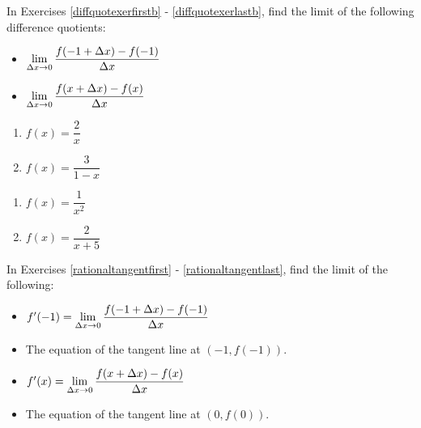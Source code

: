 In Exercises \ref{diffquotexerfirstb} - \ref{diffquotexerlastb}, find the limit of the following difference quotients:

\begin{multicols}{2}

\begin{itemize}

\item  $\displaystyle{\lim_{\Delta x \rightarrow 0} \dfrac{f(-1+\Delta x) - f(-1)}{\Delta x}}$

\item  $\displaystyle{\lim_{\Delta x \rightarrow 0} \dfrac{f(x+\Delta x) - f(x)}{\Delta x}}$

\end{itemize}

\end{multicols}

\begin{multicols}{2}
\begin{enumerate}
\setcounter{enumi}{\value{HW}}

\item $f(x) = \dfrac{2}{x}$  \label{diffquotexerfirstb}
\item $f(x) = \dfrac{3}{1-x}$

\setcounter{HW}{\value{enumi}}
\end{enumerate}
\end{multicols}

\begin{multicols}{2}
\begin{enumerate}
\setcounter{enumi}{\value{HW}}

\item  $f(x) = \dfrac{1}{x^2}$
\item\label{diffquotexerlastb}  $f(x) = \dfrac{2}{x+5}$

\setcounter{HW}{\value{enumi}}
\end{enumerate}
\end{multicols}

In Exercises \ref{rationaltangentfirst} - \ref{rationaltangentlast}, find the limit of the following:



\begin{itemize}

\item  $f'(-1) = \displaystyle{\lim_{\Delta x \rightarrow 0} \dfrac{f(-1+\Delta x) - f(-1)}{\Delta x}}$

\item The equation of the tangent line at $(-1, f(-1))$.

\item  $f'(x) = \displaystyle{\lim_{\Delta x \rightarrow 0} \dfrac{f(x+\Delta x) - f(x)}{\Delta x}}$

\item  The equation of the tangent line at $(0,f(0))$.

\end{itemize}


